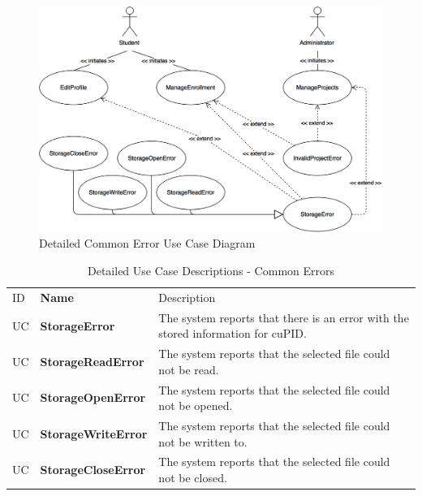 \documentclass[12pt,letterpaper]{article}
\begin{document}
\begin{figure}[H]
	\centering{}
	\includegraphics[scale=0.3]{imgs/detailed-common-error-use-case-diagram.png}
	\caption{Detailed Common Error Use Case Diagram}
\end{figure}

\begin{table}[H]
	\caption{Detailed Use Case Descriptions - Common Errors}
	\vspace{1em}
	\begin{tabu} to 
	    \tableheader{}ID & Name & Description\\
		UC & StorageError &  The system reports that there is an error with the stored information for cuPID. \\
		UC & StorageReadError & The system reports that the selected file could not be read. \\
		UC & StorageOpenError & The system reports that the selected file could not be opened. \\
		UC & StorageWriteError & The system reports that the selected file could not be written to. \\
		UC & StorageCloseError & The system reports that the selected file could not be closed. \\
	\end{tabu}
\end{table}
\end{document}
